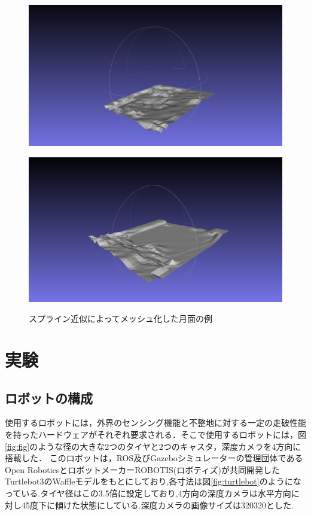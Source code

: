 \documentclass[uplatex,twocolumn, dvipdfmx]{jsarticle}  %
\begin{document}
\begin{figure}[t]
  \centering
  \begin{minipage}[b]{0.49\linewidth}
    \centering
    \includegraphics[keepaspectratio, scale=0.25]{images/spline1.png}
    \label{fig:spline1}
  \end{minipage}
  \begin{minipage}[b]{0.49\linewidth}
    \centering
    \includegraphics[keepaspectratio, scale=0.24]{images/spline2.png}
    \label{fig:spline2}
  \end{minipage}
  \caption{スプライン近似によってメッシュ化した月面の例}\label{fig:mesh_moons}
\end{figure}

\section{実験}
\subsection{ロボットの構成}
使用するロボットには，外界のセンシング機能と不整地に対する一定の走破性能を持ったハードウェアがそれぞれ要求される．そこで使用するロボットには，図\ref{fig:fig}のような径の大きな2つのタイヤと2つのキャスタ，深度カメラを4方向に搭載した．
このロボットは，ROS及びGazeboシミュレーターの管理団体であるOpen RoboticsとロボットメーカーROBOTIS(ロボティズ)が共同開発したTurtlebot3\cite{bunken4}のWaffleモデルをもとにしており,各寸法は図\ref{fig:turtlebot}のようになっている.タイヤ径はこの3.5倍に設定しており,4方向の深度カメラは水平方向に対し45度下に傾けた状態にしている.深度カメラの画像サイズは320\times320とした.
\end{document}
